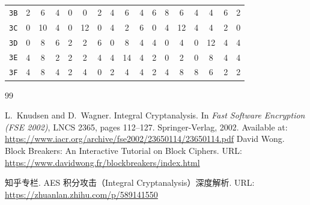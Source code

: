 \documentclass[12pt,a4paper]{article}
\begin{document}
\begin{center}
\begin{small}
\begin{longtable}{c|cccccccccccccccc}
\texttt{3B} & 2 & 6 & 4 & 0 & 0 & 2 & 4 & 6 & 4 & 6 & 8 & 6 & 4 & 4 & 6 & 2 \\
\texttt{3C} & 0 & 10 & 4 & 0 & 12 & 0 & 4 & 2 & 6 & 0 & 4 & 12 & 4 & 4 & 2 & 0 \\
\texttt{3D} & 0 & 8 & 6 & 2 & 2 & 6 & 0 & 8 & 4 & 4 & 0 & 4 & 0 & 12 & 4 & 4 \\
\texttt{3E} & 4 & 8 & 2 & 2 & 2 & 4 & 4 & 14 & 4 & 2 & 0 & 2 & 0 & 8 & 4 & 4 \\
\texttt{3F} & 4 & 8 & 4 & 2 & 4 & 0 & 2 & 4 & 4 & 2 & 4 & 8 & 8 & 6 & 2 & 2 \\ \bottomrule
\end{longtable}
\end{small}
\end{center}
\begin{thebibliography}{99}

L.~Knudsen and D.~Wagner.
\newblock Integral Cryptanalysis.
\newblock In {\em Fast Software Encryption (FSE 2002)}, 
  LNCS 2365, pages 112--127. Springer-Verlag, 2002.
\newblock Available at: \url{https://www.iacr.org/archive/fse2002/23650114/23650114.pdf}
David Wong.
\newblock Block Breakers: An Interactive Tutorial on Block Ciphers.
\newblock URL: \url{https://www.davidwong.fr/blockbreakers/index.html}

知乎专栏.
\newblock AES 积分攻击（Integral Cryptanalysis）深度解析.
\newblock URL: \url{https://zhuanlan.zhihu.com/p/589141550}
\end{thebibliography}
\end{document}
